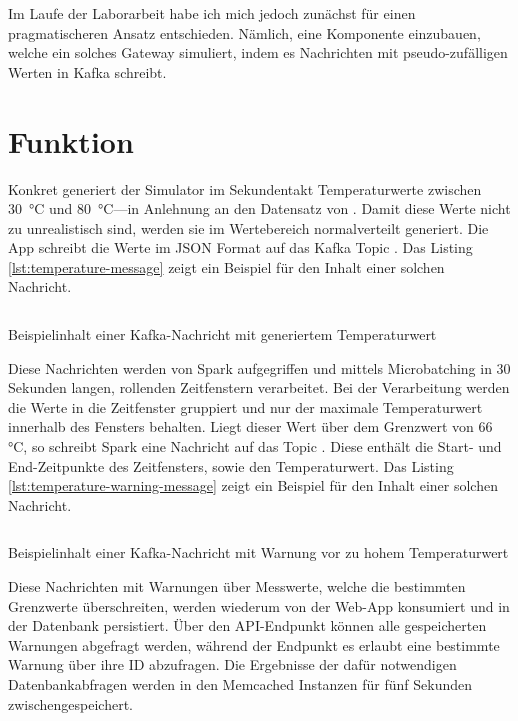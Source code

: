 Im Laufe der Laborarbeit habe ich mich jedoch zunächst für einen pragmatischeren Ansatz entschieden.
Nämlich, eine Komponente einzubauen, welche ein solches Gateway simuliert, indem es Nachrichten mit pseudo-zufälligen Werten in Kafka schreibt.

\section{Funktion}\label{sec:funktion}

Konkret generiert der Simulator im Sekundentakt Temperaturwerte zwischen 30~°C und 80~°C---in Anlehnung an den Datensatz von \cite{helwig_condition_2015}.
Damit diese Werte nicht zu unrealistisch sind, werden sie im Wertebereich normalverteilt generiert.
Die App schreibt die Werte im JSON Format auf das Kafka Topic .
Das Listing \ref{lst:temperature-message} zeigt ein Beispiel für den Inhalt einer solchen Nachricht.

\begin{listing}[H]
  \inputminted{json}{assets/src/temperature-message.json}
  \caption{Beispielinhalt einer Kafka-Nachricht mit generiertem Temperaturwert}\label{lst:temperature-message}
\end{listing}

Diese Nachrichten werden von Spark aufgegriffen und mittels Microbatching in 30 Sekunden langen, rollenden Zeitfenstern verarbeitet.
Bei der Verarbeitung werden die Werte in die Zeitfenster gruppiert und nur der maximale Temperaturwert innerhalb des Fensters behalten.
Liegt dieser Wert über dem Grenzwert von 66 °C, so schreibt Spark eine Nachricht auf das Topic .
Diese enthält die Start- und End-Zeitpunkte des Zeitfensters, sowie den Temperaturwert.
Das Listing \ref{lst:temperature-warning-message} zeigt ein Beispiel für den Inhalt einer solchen Nachricht.

\begin{listing}[H]
  \inputminted{json}{assets/src/temperature-warning-message.json}
  \caption{Beispielinhalt einer Kafka-Nachricht mit Warnung vor zu hohem Temperaturwert}\label{lst:temperature-warning-message}
\end{listing}

Diese Nachrichten mit Warnungen über Messwerte, welche die bestimmten Grenzwerte überschreiten, werden wiederum von der Web-App konsumiert und in der Datenbank persistiert.
Über den API-Endpunkt  können alle gespeicherten Warnungen abgefragt werden, während der Endpunkt  es erlaubt eine bestimmte Warnung über ihre ID abzufragen.
Die Ergebnisse der dafür notwendigen Datenbankabfragen werden in den Memcached Instanzen für fünf Sekunden zwischengespeichert.


